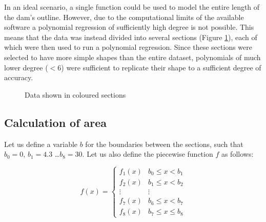 \documentclass{article}
\begin{document}
    In an ideal scenario, a single function could be used to model the entire length of the dam's outline. However, due to the computational limits of the available software a polynomial regression of sufficiently high degree is not possible. This means that the data was instead divided into several sections (Figure \ref{figSectionedData}), each of which were then  used to run a polynomial regression. Since these sections were selected to have more simple shapes than the entire dataset, polynomials of much lower degree ($< 6$) were sufficient to replicate their shape to a sufficient degree of accuracy.

    \begin{figure}
        \centering
        \caption{Data shown in coloured sections}
        \label{figSectionedData}
    \end{figure}

\subsection{Calculation of area}

    Let us define a variable $b$ for the boundaries between the sections, such that $b_0 = 0$, $b_1 = 4.3$ \ldots $b_8 = 30$. Let us also  define the piecewise function $f$ as follows:

    \begin{equation}
        f(x) = \begin{cases}
            f_1(x) & b_0 \leq x < b_1 \\
            f_2(x) & b_1 \leq x < b_2 \\
            \vdots & \vdots \\
            f_7(x) & b_6 \leq x < b_7 \\
            f_8(x) & b_7 \leq x \leq b_8
        \end{cases}
        \label{eqnPiecewiseFunction}
    \end{equation}
\end{document}
